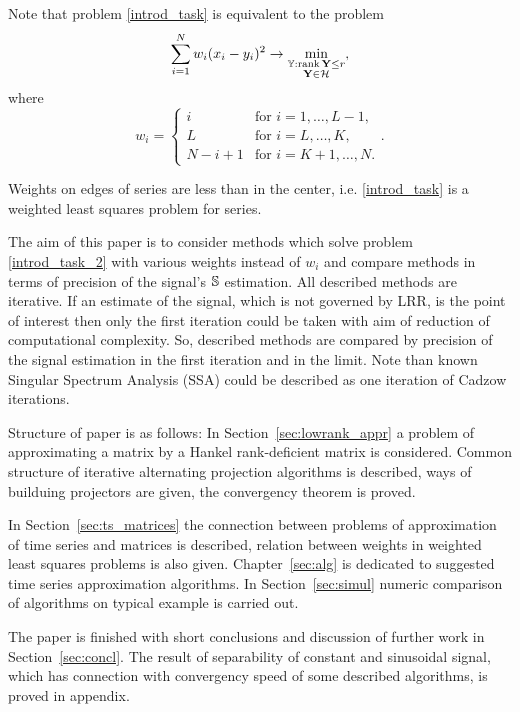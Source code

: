 \documentclass[12pt,a4paper,fleqn,leqno]{article}
\def\rank{\mathop{\mathrm{rank}}}
\begin{document}
Note that problem \eqref{introd_task} is equivalent to the problem
\begin{equation}\label{introd_task_2}
\sum_{i = 1}^N w_i(x_i - y_i)^2 \to \min_{\substack{\tsY: \rank \bfY \le r \\ \bfY \in \calH}},
\end{equation}
where
\begin{equation}
\label{eq:w}
w_i = \begin{cases}
i & \text{for $i = 1, \ldots, L-1,$}\\
L & \text{for $i = L, \ldots, K,$}\\
N - i + 1 & \text{for $i = K + 1, \ldots, N.$}
\end{cases}.
\end{equation}

Weights on edges of series are less than in the center, i.e. \eqref{introd_task} is a weighted least squares problem for series.

The aim of this paper is to consider methods which solve problem \eqref{introd_task_2} with various weights instead of $w_i$ and compare methods in terms of precision of the signal's $\mathbb{S}$ estimation. All described methods are iterative. If an estimate of the signal, which is not governed by LRR, is the point of interest then only the first iteration could be taken with aim of reduction of computational complexity. So, described methods are compared by precision of the signal estimation in the first iteration and in the limit. Note than known Singular Spectrum Analysis (SSA) \cite{Broomhead.King1986, Vautard.etal1992, Elsner.Tsonis1996, Golyandina.etal2001, Ghil.etal2002, Golyandina.Zhigljavsky2012} could be
described as one iteration of Cadzow iterations.

Structure of paper is as follows:  In Section~\ref{sec:lowrank_appr} a problem of approximating a matrix by a Hankel rank-deficient matrix is considered. Common structure of iterative alternating projection algorithms is described, ways of builduing projectors are given, the convergency theorem is proved.

In Section~\ref{sec:ts_matrices} the connection between problems of approximation of time series and matrices is described, relation between weights in weighted least squares problems is also given. Chapter~\ref{sec:alg} is dedicated to suggested time series approximation algorithms. In Section~\ref{sec:simul} numeric comparison of algorithms on typical example is carried out.

The paper is finished with short conclusions and discussion of further work in Section~\ref{sec:concl}. The result of separability of constant and sinusoidal signal, which has connection with convergency speed of some described algorithms, is proved in appendix.
\end{document}
